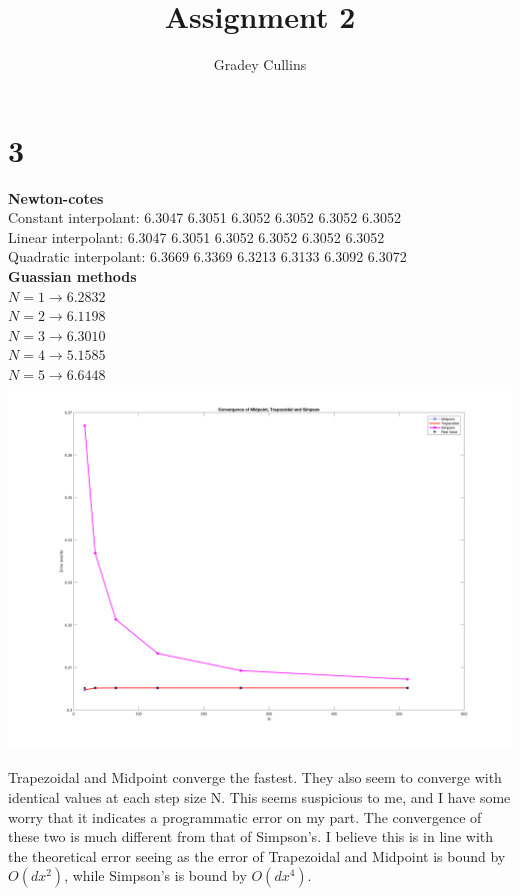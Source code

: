 \documentclass[10pt,a4paper]{article}
\author{Gradey Cullins}
\title{Assignment 2}
\begin{document}
\maketitle

\section*{3}
\textbf{Newton-cotes}\\
Constant interpolant:  6.3047    6.3051    6.3052    6.3052    6.3052    6.3052 \\
Linear interpolant:  6.3047    6.3051    6.3052    6.3052    6.3052    6.3052 \\
Quadratic interpolant: 6.3669    6.3369    6.3213    6.3133    6.3092    6.3072 \\

\noindent
\textbf{Guassian methods}\\
$N = 1 \rightarrow 6.2832 $  \\
$N = 2 \rightarrow 6.1198 $ \\
$N = 3 \rightarrow 6.3010 $ \\ 
$N = 4 \rightarrow 5.1585 $ \\
$N = 5 \rightarrow 6.6448 $  \\


\noindent
\includegraphics[scale=0.14]{cotes_convergence.png}

Trapezoidal and Midpoint converge the fastest. They also seem to converge with identical values at each step size N. This seems suspicious to me, and I have some
worry that it indicates a programmatic error on my part. The convergence of these two is much different from that of Simpson's. I believe this is in line with the
theoretical error seeing as the error of Trapezoidal and Midpoint is bound by $ O(dx^2) $, while Simpson's is bound by $ O(dx^4) $. \\
\end{document}
